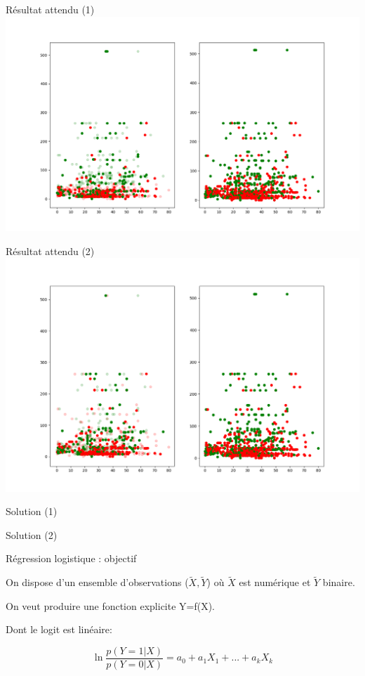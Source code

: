 \documentclass[11pt]{beamer}
\newcommand{\Pythonsmall}[1]{
	{\scriptsize }
}
\begin{document}
\begin{frame}{Résultat attendu (1)}
\includegraphics[scale=0.35]{ex507}
\end{frame}

\begin{frame}{Résultat attendu (2)}
\includegraphics[scale=0.35]{ex508}
\end{frame}

\begin{frame}{Solution (1)}
\vspace{-0.3cm}
\Pythonsmall{ex507}
\end{frame}

\begin{frame}{Solution (2)}
\vspace{-0.3cm}
\Pythonsmall{ex508}
\end{frame}


\begin{frame}{Régression logistique : objectif}

On dispose d'un ensemble d'observations ($\tilde{X},\tilde{Y}$) où $\tilde{X}$ est numérique et $\tilde{Y}$ binaire.

\pause
\vspace{0.2cm}

On veut produire une fonction explicite Y=f(X).\\
\pause
\vspace{0.2cm}

Dont le logit est linéaire:

$$\ln {\frac {p(Y=1\vert X)}{p(Y=0\vert X)}}=a_{0}+a_{1}X_{1}+...+a_{k}X_{k}$$
\end{frame}
\end{document}
